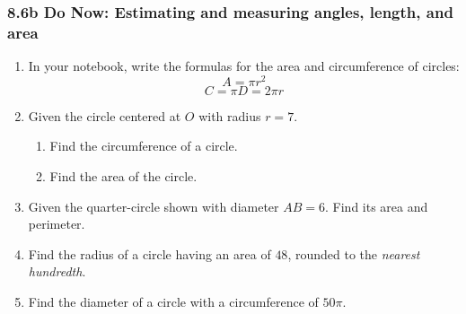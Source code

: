 \documentclass[12pt, twoside]{article}
\begin{document}
\subsubsection*{8.6b Do Now: Estimating and measuring angles, length, and area}
 \begin{enumerate}

  \item In your notebook, write the formulas for the area and circumference of circles:
\[A=\pi r^2\]
\[C=\pi D = 2\pi r\]

  \item Given the circle centered at $O$ with radius $r=7$.
  \begin{multicols}{2}
    \begin{enumerate}
      \item Find the circumference of a circle. %
      \item Find the area of the circle.\vspace{3cm}
    \end{enumerate}
  \end{multicols}

  \item Given the quarter-circle shown with diameter $AB=6$. Find its area and perimeter.
    \begin{flushright}
  \end{flushright} \vspace{1cm}

  \item Find the radius of a circle having an area of $48$, rounded to the \emph{nearest hundredth}. \vspace{2cm}
  \item Find the diameter of a circle with a circumference of $50\pi$.


\end{enumerate}
\end{document}
